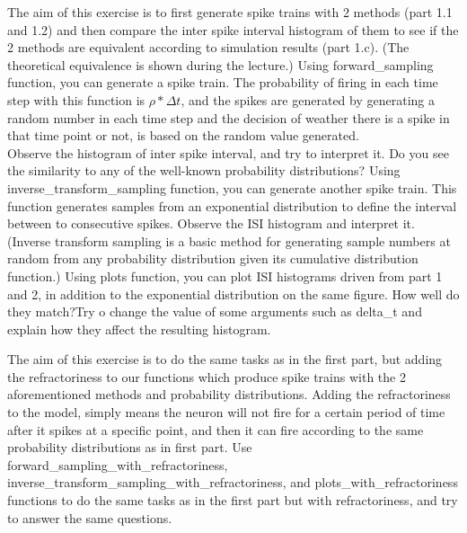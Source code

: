 \documentclass[a4paper,10pt]{Exercises}
\begin{document}
\Exercise[]
The aim of this exercise is to first generate spike trains with 2 methods (part 1.1 and 1.2) and then compare the inter spike interval histogram of them to see if the 2 methods are equivalent according to simulation results (part 1.c). (The theoretical equivalence is shown during the lecture.)  
\Question Using forward\_sampling function, you can generate a spike train. The probability of firing in each time step with this function is $\rho*\Delta t$, and the spikes are generated by generating a random number in each time step and the decision of weather there is a spike in that time point or not, is based on the random value generated. \\
Observe the histogram of inter spike interval, and try to interpret it. Do you see the similarity to any of the well-known probability distributions?
\Question Using inverse\_transform\_sampling function, you can generate another spike train. This function generates samples from an exponential distribution to define the interval between to consecutive spikes. Observe the ISI histogram and interpret it.\\ (Inverse transform sampling is a basic method for generating sample numbers at random from any probability distribution given its cumulative distribution function.)
\Question Using plots function, you can plot ISI histograms driven from part 1 and 2, in addition to the exponential distribution on the same figure. How well do they match?Try o change the value of some arguments such as delta\_t and explain how they affect the resulting histogram.

\Exercise[]
The aim of this exercise is to do the same tasks as in the first part, but adding the refractoriness to our functions which  produce spike trains with the 2 aforementioned methods and probability distributions. Adding the refractoriness to the model, simply means the neuron will not fire for a certain period of time after it spikes at a specific point, and then it can fire according to the same probability distributions as in first part.
\Question Use forward\_sampling\_with\_refractoriness, inverse\_transform\_sampling\_with\_refractoriness, and plots\_with\_refractoriness functions to do the same tasks as in the first part but with refractoriness, and try to answer the same questions.

\end{document}
